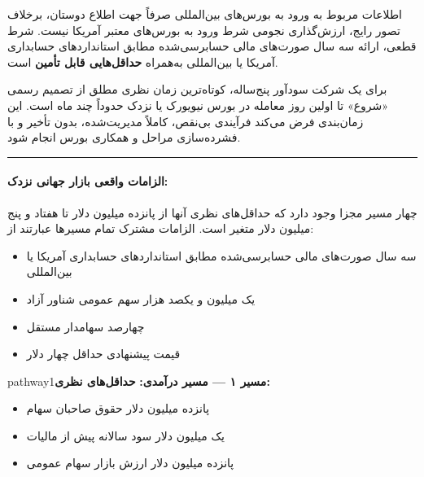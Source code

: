 \documentclass[10pt]{report}
\newcommand{\highlight}[1]{\textcolor{primaryBlue}{\textbf{#1}}}
\begin{document}
\begin{mainbox}{اطلاعات مربوط به ورود به بورس‌های بین‌المللی}
صرفاً جهت اطلاع دوستان، برخلاف تصور رایج، ارزش‌گذاری نجومی شرط ورود به بورس‌های معتبر آمریکا نیست. شرط قطعی، ارائه سه سال صورت‌های مالی حسابرسی‌شده مطابق استانداردهای حسابداری آمریکا یا بین‌المللی به‌همراه \highlight{حداقل‌هایی قابل تأمین} است.

\vspace{1em}
برای یک شرکت سودآور پنج‌ساله، کوتاه‌ترین زمان نظری مطلق از تصمیم رسمی «شروع» تا اولین روز معامله در بورس نیویورک یا نزدک حدوداً چند ماه است. این زمان‌بندی فرض می‌کند فرآیندی بی‌نقص، کاملاً مدیریت‌شده، بدون تأخیر و با فشرده‌سازی مراحل و همکاری بورس انجام شود.

\vspace{1.5em}
\begin{center}
\color{primaryBlue}\rule{0.8\textwidth}{0.8pt}
\end{center}

\vspace{0.8em}

\paragraph{الزامات واقعی بازار جهانی نزدک:}
چهار مسیر مجزا وجود دارد که حداقل‌های نظری آنها از پانزده میلیون دلار تا هفتاد و پنج میلیون دلار متغیر است. الزامات مشترک تمام مسیرها عبارتند از:

\vspace{0.5em}
\begin{itemize}[label={\textcolor{primaryBlue}{\textbullet}}]
  \item سه سال صورت‌های مالی حسابرسی‌شده مطابق استانداردهای حسابداری آمریکا یا بین‌المللی
  \item یک میلیون و یکصد هزار سهم عمومی شناور آزاد
  \item چهارصد سهامدار مستقل
  \item قیمت پیشنهادی حداقل چهار دلار
\end{itemize}

\vspace{1.5em}

\begin{pathwaybox}{pathway1}{\textbf{مسیر ۱ — مسیر درآمدی:}}
\textbf{حداقل‌های نظری:}
\begin{itemize}[label={\textcolor{accentBlue}{\textbullet}}]
  \item پانزده میلیون دلار حقوق صاحبان سهام
  \item یک میلیون دلار سود سالانه پیش از مالیات
  \item پانزده میلیون دلار ارزش بازار سهام عمومی
\end{itemize}


\end{pathwaybox}
\end{mainbox}
\end{document}
